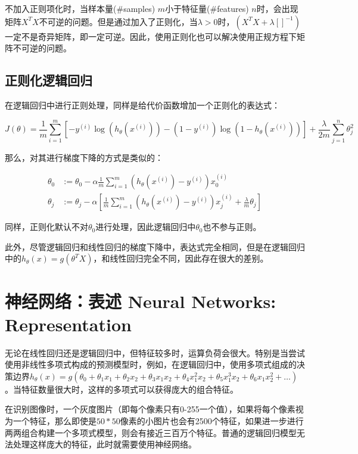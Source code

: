 \documentclass[12pt, a4paper]{article}
\begin{document}
不加入正则项化时，当样本量($\#$samples) $m$小于特征量($\#$features) $n$时，会出现矩阵$X^TX$不可逆的问题。但是通过加入了正则化，当$\lambda>0$时，$(X^TX+\lambda[ ]^{-1})$一定不是奇异矩阵，即一定可逆。因此，使用正则化也可以解决使用正规方程下矩阵不可逆的问题。

\subsection{正则化逻辑回归}

在逻辑回归中进行正则处理，同样是给代价函数增加一个正则化的表达式：

\begin{equation*}
    J(\theta)=\frac{1}{m}\sum_{i=1}^{m}\left[-y^{(i)}\log\left(h_\theta(x^{(i)})\right)-(1-y^{(i)})\log\left(1-h_\theta(x^{(i)})\right)\right]+\frac{\lambda}{2m}\sum_{j=1}^{n}\theta_j^2
\end{equation*}

那么，对其进行梯度下降的方式是类似的：

\begin{align*}
    \theta_0 & :=\theta_0-\alpha\frac{1}{m}\sum_{i=1}^{m}(h_\theta(x^{(i)})-y^{(i)})x_0^{(i)}                                        \\
    \theta_j & :=\theta_j-\alpha\left[\frac{1}{m}\sum_{i=1}^{m}(h_\theta(x^{(i)})-y^{(i)})x_j^{(i)}+\frac{\lambda}{m}\theta_j\right]
\end{align*}

同样，正则化默认不对$\theta_0$进行处理，因此逻辑回归中$\theta_0$也不参与正则。

此外，尽管逻辑回归和线性回归的梯度下降中，表达式完全相同，但是在逻辑回归中的$h_\theta(x)=g(\theta^TX)$，和线性回归完全不同，因此存在很大的差别。

\section{神经网络：表述 Neural Networks: Representation}

无论在线性回归还是逻辑回归中，但特征较多时，运算负荷会很大。特别是当尝试使用非线性多项式构成的预测模型时，例如，在逻辑回归中，使用多项式组成的决策边界$h_\theta(x) = g(\theta_0 + \theta_1x_1 + \theta_2x_2 + \theta_3x_1x_2 + \theta_4x_1^2x_2+\theta_5x_1^3x_2 + \theta_6x_1x_2^2+\dots)$。当特征数量很大时，这样的多项式可以获得庞大的组合特征。

在识别图像时，一个灰度图片（即每个像素只有0-255一个值），如果将每个像素视为一个特征，那么即使是$50*50$像素的小图片也会有2500个特征，如果进一步进行两两组合构建一个多项式模型，则会有接近三百万个特征。普通的逻辑回归模型无法处理这样庞大的特征，此时就需要使用神经网络。
\end{document}
